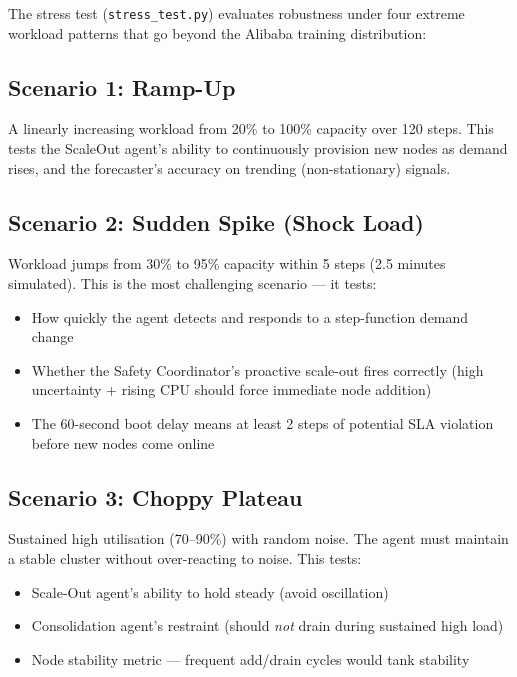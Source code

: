 \documentclass[11pt,a4paper]{article}
\begin{document}
The stress test (\texttt{stress\_test.py}) evaluates robustness under four
extreme workload patterns that go beyond the Alibaba training distribution:

\subsection{Scenario 1: Ramp-Up}

A linearly increasing workload from 20\% to 100\% capacity over 120 steps.
This tests the ScaleOut agent's ability to continuously provision new nodes
as demand rises, and the forecaster's accuracy on trending (non-stationary)
signals.

\subsection{Scenario 2: Sudden Spike (Shock Load)}

Workload jumps from 30\% to 95\% capacity within 5 steps
(2.5 minutes simulated). This is the most challenging scenario --- it tests:
\begin{itemize}[leftmargin=2em]
  \item How quickly the agent detects and responds to a step-function demand
        change
  \item Whether the Safety Coordinator's proactive scale-out fires correctly
        (high uncertainty + rising CPU should force immediate node addition)
  \item The 60-second boot delay means at least 2 steps of potential SLA
        violation before new nodes come online
\end{itemize}

\subsection{Scenario 3: Choppy Plateau}

Sustained high utilisation (70--90\%) with random noise. The agent must
maintain a stable cluster without over-reacting to noise. This tests:
\begin{itemize}[leftmargin=2em]
  \item Scale-Out agent's ability to hold steady (avoid oscillation)
  \item Consolidation agent's restraint (should \textit{not} drain during
        sustained high load)
  \item Node stability metric --- frequent add/drain cycles would tank
        stability
\end{itemize}
\end{document}
